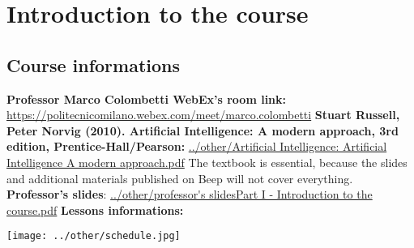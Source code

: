 \section{Introduction to the course}
\subsection{Course informations}
\textbf{Professor Marco Colombetti WebEx's room link:}\newline
\url{https://politecnicomilano.webex.com/meet/marco.colombetti}\newline
\newline
\textbf{Stuart Russell, Peter Norvig (2010). Artificial Intelligence: A modern approach, 3rd edition, Prentice-Hall/Pearson:}\newline
\url{../other/Artificial Intelligence: Artificial Intelligence A modern approach.pdf}\newline
The textbook is essential, because the slides and additional materials published on Beep will
not cover everything.\newline
\newline
\textbf{Professor's slides}:\newline
\url{../other/professor's slidesPart I - Introduction to the course.pdf}
\newline
\newline
\textbf{Lessons informations:}
\begin{center}
    \texttt{[image: ../other/schedule.jpg]}
\end{center}
